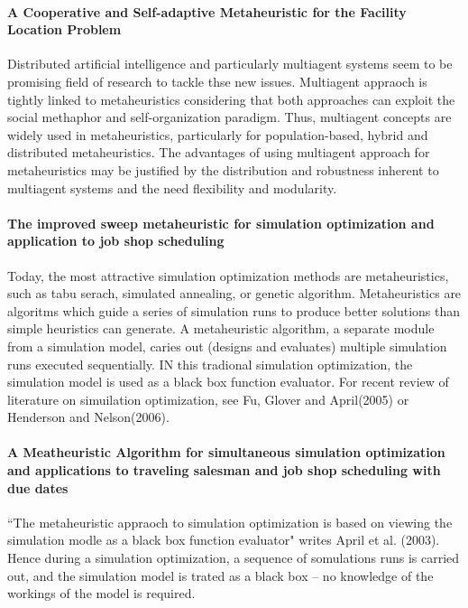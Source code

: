 \paragraph{A Cooperative and Self-adaptive Metaheuristic for the Facility Location Problem}
Distributed artificial intelligence and particularly multiagent systems seem to be promising field of research to tackle thse new issues. Multiagent appraoch  is tightly linked to metaheuristics considering that both approaches can exploit the social methaphor and self-organization paradigm. Thus, multiagent concepts are widely used in metaheuristics, particularly for population-based, hybrid and distributed metaheuristics. The advantages of using multiagent approach for metaheuristics may be justified by the distribution and robustness inherent to multiagent systems and the need flexibility and modularity.

\paragraph{The improved sweep metaheuristic for simulation optimization and application to job shop scheduling}
Today, the most attractive simulation optimization methods are metaheuristics, such as tabu serach, simulated annealing, or genetic algorithm. Metaheuristics are algoritms which guide a series of simulation runs to produce better solutions than simple heuristics can generate. A metaheuristic algorithm, a separate module from a simulation model, caries out (designs and evaluates) multiple simulation runs executed sequentially. IN this tradional simulation optimization, the simulation model is used as a black box function evaluator. For recent review of literature on simuilation optimization, see Fu, Glover and April(2005) or Henderson and Nelson(2006).

\paragraph{A Meatheuristic Algorithm for simultaneous simulation optimization and applications to traveling salesman and job shop scheduling with due dates}
``The metaheuristic appraoch to simulation optimization is based on viewing the simulation modle as a black box function evaluator" writes April et al. (2003). Hence during a simulation optimization, a sequence of somulations runs is carried out, and the simulation model is trated as a black box -- no knowledge of the workings of the model is required.

